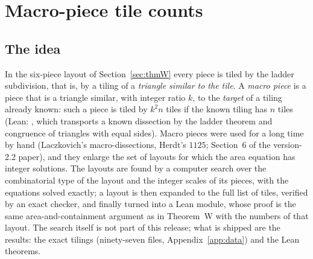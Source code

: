 \documentclass[11pt,reqno]{amsart}
\theoremstyle{plain}
\theoremstyle{definition}
\begin{document}
\section{Macro-piece tile counts}\label{sec:macro}

\subsection{The idea}
In the six-piece layout of Section~\ref{sec:thmW} every piece is tiled by the ladder subdivision, that is, by a tiling of a \emph{triangle similar to the tile}.
A \emph{macro piece} is a piece that is a triangle similar, with integer ratio $k$, to the \emph{target} of a tiling already known: such a piece is tiled by $k^2n$ tiles if the known tiling has $n$ tiles (Lean: , which transports a known dissection by the ladder theorem and congruence of triangles with equal sides).
Macro pieces were used for a long time by hand (Laczkovich's macro-dissections, Herdt's $1125$; Section~6 of the version-2.2 paper), and they enlarge the set of layouts for which the area equation has integer solutions.
The layouts are found by a computer search over the combinatorial type of the layout and the integer scales of its pieces, with the equations solved exactly; a layout is then expanded to the full list of tiles, verified by an exact checker, and finally turned into a Lean module, whose proof is the same area-and-containment argument as in Theorem~W with the numbers of that layout.
The search itself is not part of this release; what is shipped are the results: the exact tilings (ninety-seven files, Appendix~\ref{app:data}) and the Lean theorems.
\end{document}
